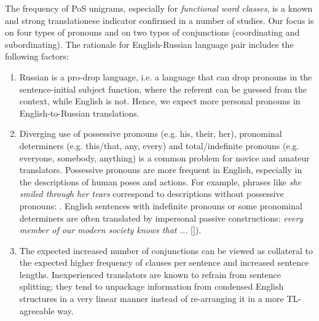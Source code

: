 The frequency of PoS unigrams, especially for \textit{functional word classes}, is a known and strong translationese indicator confirmed in a number of studies. Our focus is on four types of pronouns and on two types of conjunctions (coordinating and subordinating). 
The rationale for English-Russian language pair includes the following factors: 
\begin{enumerate}\compresslist{}
	\item Russian is a pro-drop language, i.e. a language that can drop pronouns in the sentence-initial subject function, where the referent can be guessed from the context, while English is not. Hence, we expect more personal pronouns in English-to-Russian translations. %
	\item Diverging use of possessive pronouns (e.g. his, their, her), pronominal determiners (e.g. this/that, any, every) and total/indefinite pronouns (e.g. everyone, somebody, anything) is a common problem for novice and amateur translators. Possessive pronouns are more frequent in English, especially in the descriptions of human poses and actions. For example, phrases like \textit{she smiled through her tears} correspond to descriptions without possessive pronouns: . English sentences with indefinite pronouns or some pronominal determiners are often translated by impersonal passive constructions: \textit{every member of our modern society knows that ...} []). 
	\item The expected increased number of conjunctions can be viewed as collateral to the expected higher frequency of clauses per sentence and increased sentence lengths. Inexperienced translators are known to refrain from sentence splitting; they tend to unpackage information from condensed English structures in a very linear manner instead of re-arranging it in a more TL-agreeable way.  
\end{enumerate}

